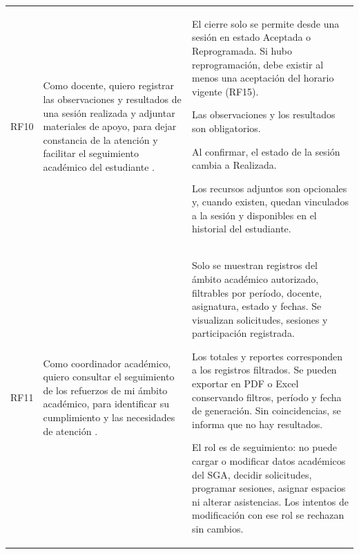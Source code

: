 \begin{longtable}{@{}p{}p{}p{}@{}}
RF10 &
Como docente, quiero registrar las observaciones y
resultados de una sesión realizada y adjuntar materiales
de apoyo, para dejar constancia de la atención y facilitar
el seguimiento académico del estudiante \cite{Daz2025}. &
El cierre solo se permite desde una sesión en estado
Aceptada o Reprogramada. Si hubo reprogramación,
debe existir al menos una aceptación del horario vigente (RF15).
\par\smallskip\noindent
Las observaciones y los resultados son obligatorios.
\par\smallskip\noindent
Al confirmar, el estado de la sesión cambia a Realizada.
\par\smallskip\noindent
Los recursos adjuntos son opcionales y, cuando existen,
quedan vinculados a la sesión y disponibles en el
historial del estudiante. \\

RF11 &
Como coordinador académico, quiero consultar el seguimiento
de los refuerzos de mi ámbito académico, para identificar
su cumplimiento y las necesidades de atención
\cite{Ponce2025-Entrevista,SGRA-documentacion-original}. &
Solo se muestran registros del ámbito académico autorizado,
filtrables por período, docente, asignatura, estado y fechas.
Se visualizan solicitudes, sesiones y participación registrada.
\par\smallskip\noindent
Los totales y reportes corresponden a los registros filtrados.
Se pueden exportar en PDF o Excel conservando filtros,
período y fecha de generación. Sin coincidencias, se informa
que no hay resultados.
\par\smallskip\noindent
El rol es de seguimiento: no puede cargar o modificar datos
académicos del SGA, decidir solicitudes, programar sesiones,
asignar espacios ni alterar asistencias. Los intentos de
modificación con ese rol se rechazan sin cambios. \\


\end{longtable}
